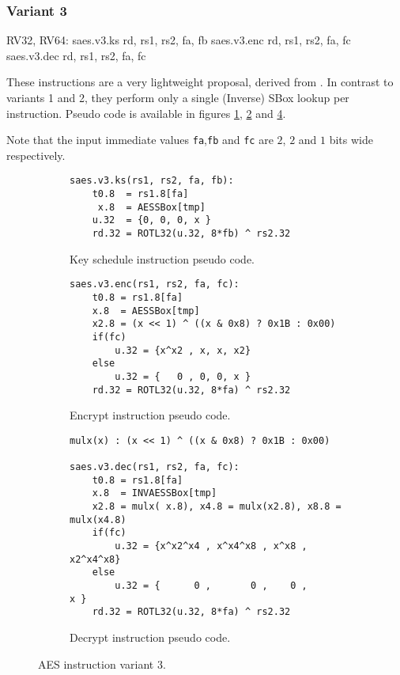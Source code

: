 \subsubsection{Variant 3}

\begin{cryptoisa}
RV32, RV64:
    saes.v3.ks     rd, rs1, rs2, fa, fb    
    saes.v3.enc    rd, rs1, rs2, fa, fc
    saes.v3.dec    rd, rs1, rs2, fa, fc
\end{cryptoisa}

These instructions are a very lightweight proposal, derived from
\cite{MJS:20}.
In contrast to variants 1 and 2, they perform only a single (Inverse) SBox
lookup per instruction.
Pseudo code is available in figures
\ref{fig:pesudo:aes:v3:ks},
\ref{fig:pesudo:aes:v3:enc} and
\ref{fig:pesudo:aes:v3:dec}.

Note that the input immediate values {\tt fa},{\tt fb} and {\tt fc}
are $2$, $2$ and $1$ bits wide respectively.

\begin{figure}

\begin{subfigure}[b]{1.0\textwidth}
\begin{lstlisting}
saes.v3.ks(rs1, rs2, fa, fb):
    t0.8  = rs1.8[fa]
     x.8  = AESSBox[tmp]
    u.32  = {0, 0, 0, x }
    rd.32 = ROTL32(u.32, 8*fb) ^ rs2.32
\end{lstlisting}
\caption{Key schedule instruction pseudo code.}
\label{fig:pesudo:aes:v3:ks}
\end{subfigure}

\begin{subfigure}[b]{1.0\textwidth}
\begin{lstlisting}
saes.v3.enc(rs1, rs2, fa, fc):
    t0.8 = rs1.8[fa]
    x.8  = AESSBox[tmp]
    x2.8 = (x << 1) ^ ((x & 0x8) ? 0x1B : 0x00)
    if(fc)
        u.32 = {x^x2 , x, x, x2}
    else
        u.32 = {   0 , 0, 0, x }
    rd.32 = ROTL32(u.32, 8*fa) ^ rs2.32
\end{lstlisting}
\caption{Encrypt instruction pseudo code.}
\label{fig:pesudo:aes:v3:enc}
\end{subfigure}

\begin{subfigure}[b]{1.0\textwidth}
\begin{lstlisting}
mulx(x) : (x << 1) ^ ((x & 0x8) ? 0x1B : 0x00)

saes.v3.dec(rs1, rs2, fa, fc):
    t0.8 = rs1.8[fa]
    x.8  = INVAESSBox[tmp]
    x2.8 = mulx( x.8), x4.8 = mulx(x2.8), x8.8 = mulx(x4.8)
    if(fc)
        u.32 = {x^x2^x4 , x^x4^x8 , x^x8 , x2^x4^x8}
    else
        u.32 = {      0 ,       0 ,    0 ,       x }
    rd.32 = ROTL32(u.32, 8*fa) ^ rs2.32
\end{lstlisting}
\caption{Decrypt instruction pseudo code.}
\label{fig:pesudo:aes:v3:dec}
\end{subfigure}
\caption{AES instruction variant 3.}
\end{figure}
